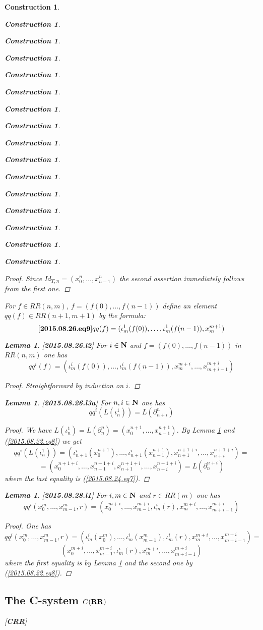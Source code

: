 \documentclass[12pt]{amsart}
\newenvironment{eq}{\begin{equation}}{\end{equation}}
\newtheorem{lemma}[proposition]{Lemma}
\newtheorem{construction}[proposition]{Construction}
\newcommand{\llabel}[1]{\label{#1}[{\bf #1}]}
\newcommand{\nn}{{\bf N\rm}}
\newcommand{\nat}{\nn}
\newcommand{\RR}{{\bf RR}}
\begin{document}
\begin{construction}
\begin{construction}
\begin{construction}
\begin{construction}
\begin{construction}
\begin{construction}
\begin{construction}
\begin{construction}
\begin{construction}
\begin{construction}
\begin{construction}
\begin{construction}
\begin{construction}
\begin{construction}
\begin{construction}
\begin{construction}
\begin{proof}
Since $Id_{T,n}=(x_0^n,\dots,x_{n-1}^n)$ the second assertion immediately follows from the first one.
\end{proof}
%
For $f\in RR(n,m)$, $f=(f(0),\dots,f(n-1))$ define an element $qq(f)\in RR(n+1,m+1)$ by the formula: 
%
\begin{eq}\llabel{2015.08.26.eq9}
qq(f)=(\iota_m^1(f(0)),\dots,\iota_m^1(f(n-1)),x_m^{m+1})
\end{eq}
%
\begin{lemma}
\llabel{2015.08.26.l2}
For $i\in\nat$ and $f=(f(0),\dots,f(n-1))$ in $RR(n,m)$ one has
%
$$qq^i(f)=(\iota_m^i(f(0)),\dots,\iota_m^i(f(n-1)),x_m^{m+i},\dots,x_{m+i-1}^{m+i})$$
%
\end{lemma}
%
\begin{proof}
Straightforward by induction on $i$.
\end{proof}
%
\begin{lemma}
\llabel{2015.08.26.l3a}
For $n,i\in\nat$ one has
%
$$qq^i(L(\iota_n^1))=L(\partial^n_{n+i})$$
%
\end{lemma}
%
\begin{proof}
We have ${L}(\iota_n^1)=L(\partial_n^n)=(x_0^{n+1},\dots,x^{n+1}_{n-1})$. By Lemma \ref{2015.08.26.l2} and (\ref{2015.08.22.eq8}) we get
%
$$qq^i({L}(\iota_n^1))=(\iota_{n+1}^i(x_0^{n+1}),\dots,\iota_{n+1}^i(x_{n-1}^{n+1}),x_{n+1}^{n+1+i},\dots,x_{n+i}^{n+1+i})=$$
$$=(x_0^{n+1+i},\dots,x_{n-1}^{n+1+i},x_{n+1}^{n+1+i},\dots,x_{n+i}^{n+1+i})={L}(\partial_n^{n+i})$$
%
where the last equality is (\ref{2015.08.24.eq7}). 
\end{proof}
%
\begin{lemma}
\llabel{2015.08.28.l1}
For $i,m\in\nat$ and $r\in RR(m)$ one has
%
$$qq^i(x_0^m,\dots,x^m_{m-1},r)=(x_0^{m+i},\dots,x^{m+i}_{m-1},\iota_m^i(r),x_m^{m+i},\dots,x_{m+i-1}^{m+i})$$
%
\end{lemma}
%
\begin{proof}
One has
%
$$qq^i(x_0^m,\dots,x^m_{m-1},r)=(\iota_m^i(x_0^m),\dots,\iota_m^i(x^m_{m-1}),\iota_m^i(r),x_m^{m+i},\dots,x_{m+i-1}^{m+i})=$$
$$(x_0^{m+i},\dots,x^{m+i}_{m-1},\iota_m^i(r),x_m^{m+i},\dots,x_{m+i-1}^{m+i})$$
%
where the first equality is by Lemma \ref{2015.08.26.l2} and the second one by (\ref{2015.08.22.eq8}). 
\end{proof}
%






\subsection{The C-system $C(\RR)$}
%
\llabel{CRR}


\end{construction}
\end{construction}
\end{construction}
\end{construction}
\end{construction}
\end{construction}
\end{construction}
\end{construction}
\end{construction}
\end{construction}
\end{construction}
\end{construction}
\end{construction}
\end{construction}
\end{construction}
\end{construction}
\end{document}
